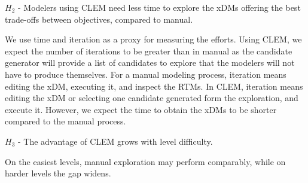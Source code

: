 \documentclass[11pt,a4paper]{article}
\begin{document}



\begin{framedtext}
$H_2$ - Modelers using CLEM need less time to explore the xDMs offering the best trade-offs between objectives, compared to manual. 
\end{framedtext}

We use time and iteration as a proxy for measuring the efforts. 
Using CLEM, we expect the number of iterations to be greater than in manual as the candidate generator will provide a list of candidates to explore that the modelers will not have to produce themselves. 
For a manual modeling process, iteration means editing the xDM, executing it, and inspect the RTMs. 
In CLEM, iteration means editing the xDM or selecting one candidate generated form the exploration, and execute it. 
However, we expect the time to obtain the xDMs to be shorter compared to the manual process.

\begin{framedtext}
$H_3$ - The advantage of CLEM grows with level difficulty. 
\end{framedtext}

On the easiest levels, manual exploration may perform comparably, while on harder levels the gap widens. 
\end{document}
